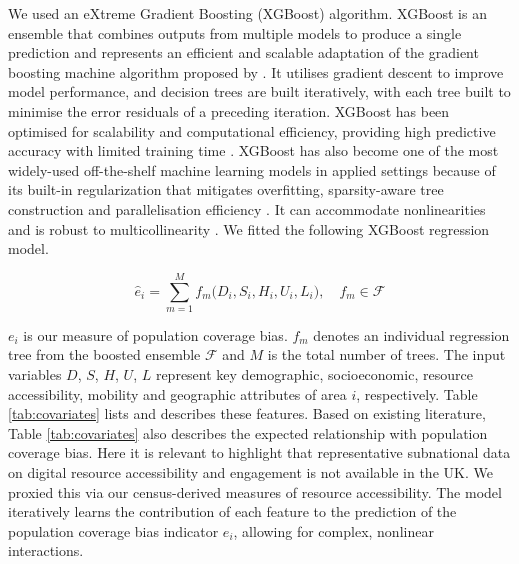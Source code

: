 \documentclass[]{rsos}%
\begin{document}
We used an eXtreme Gradient Boosting (XGBoost) algorithm. XGBoost is an
ensemble that combines outputs from multiple models to produce a single
prediction and represents an efficient and scalable adaptation of the
gradient boosting machine algorithm proposed by \citep{friedman2001a}. It
utilises gradient descent to improve model performance, and decision
trees are built iteratively, with each tree built to minimise the error
residuals of a preceding iteration. XGBoost has been optimised for
scalability and computational efficiency, providing high predictive
accuracy with limited training time \citep{chen2016, nielsen2016tree}.
XGBoost has also become one of the most widely-used off-the-shelf
machine learning models in applied settings because of its built-in
regularization that mitigates overfitting, sparsity-aware tree
construction and parallelisation efficiency \citep{chen2016}. It can
accommodate nonlinearities and is robust to multicollinearity
\citep{chen2016}. We fitted the following XGBoost regression model.

\begin{equation} \label{eq:xgb-model}
\widehat{e}_i 
= \sum_{m=1}^M f_m\bigl(D_i, S_i, H_i, U_i, L_i\bigr),
\quad f_m \in \mathcal{F}
\end{equation}

\(e_i\) is our measure of population coverage bias. \(f_m\) denotes an individual
regression tree from the boosted ensemble \(\mathcal{F}\) and \(M\) is the
total number of trees. The input variables \(D\), \(S\), \(H\), \(U\), \(L\)
represent key demographic, socioeconomic, resource accessibility, mobility and geographic attributes of area \(i\), respectively. Table
\ref{tab:covariates} lists and describes these features. Based on existing literature, Table
\ref{tab:covariates} also describes the expected relationship with population coverage bias. Here it is relevant to highlight that representative subnational data on digital resource accessibility and engagement is not available in the UK. We proxied this via our census-derived measures of resource accessibility. The model iteratively
learns the contribution of each feature to the prediction of the population coverage bias indicator \(e_i\), allowing for complex, nonlinear interactions.
\end{document}
